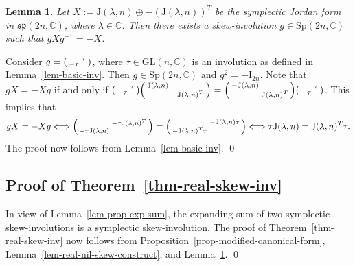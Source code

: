 \documentclass[11pt,reqno]{amsart}
\renewenvironment{proof}{{\bfseries Proof.}}{\qed}
\numberwithin{equation}{section}
\newtheorem{lemma}[theorem]{Lemma}
\theoremstyle{definition}
\def\C{\mathbb C}
\def\C{\mathbb {C}}
\newcommand{\thmref}[1]{Theorem~\ref{#1}}
\newcommand{\lemref}[1]{Lemma~\ref{#1}}
\newcommand{\propref}[1]{Proposition~\ref{#1}}
\begin{document}
\begin{lemma}\label{lem-real-non-nil-skew-construct}
	Let $X:= \mathrm{J}(\lambda, n) \oplus - (\mathrm{J}(\lambda, n))^{T}$ be the symplectic Jordan form in $\mathfrak{sp}(2n,\mathbb{C})$, where $\lambda \in \C$. Then there exists a skew-involution $g\in \mathrm{Sp}(2n,\mathbb{C})$ such that $gXg^{-1}=-X$.
\end{lemma}
\begin{proof}
	Consider $g=  \begin{psmallmatrix}
		& \tau\\
		-	\tau	& 
	\end{psmallmatrix}$, where $\tau \in \mathrm{GL}(n,\C)$ is an involution  as defined in \lemref{lem-basic-inv}. Then  $g \in \mathrm{Sp}(2n,\mathbb{C})$ and $ g^2= -\mathrm{I}_{2n}$. Note that $gX =-Xg$ if and only if $ \begin{psmallmatrix}
		& \tau\\
		-	\tau	& 
	\end{psmallmatrix} \begin{psmallmatrix}
		\mathrm{J}(\lambda, n) &  \\
		& -  \mathrm{J}(\lambda, n)^{T}
	\end{psmallmatrix} =   \begin{psmallmatrix}
		-	\mathrm{J}(\lambda, n) &  \\
		&  \mathrm{J}(\lambda, n)^{T}
	\end{psmallmatrix} \begin{psmallmatrix}
		& \tau\\
		-	\tau	& 
	\end{psmallmatrix}$. This implies that
	\begin{equation*}
		gX =-Xg	\Longleftrightarrow 	\begin{psmallmatrix}
			& 	-\tau  \mathrm{J}(\lambda, n)^{T}\\
			- \tau	 \mathrm{J}(\lambda, n)	& 	
		\end{psmallmatrix} =  	\begin{psmallmatrix}
			& 	- \mathrm{J}(\lambda, n) \tau \\
			- 	 \mathrm{J}(\lambda, n)^{T} \tau	& 	
		\end{psmallmatrix}  \Longleftrightarrow  \tau \mathrm{J}(\lambda, n) = 	\mathrm{J}(\lambda, n)^{T} \tau.
	\end{equation*}
	The proof now follows from \lemref{lem-basic-inv}.
\end{proof}

\subsection{Proof of \thmref{thm-real-skew-inv}} In view of \lemref{lem-prop-exp-sum}, the expanding sum of two symplectic skew-involutions is a symplectic skew-involution. The proof of  \thmref{thm-real-skew-inv} now follows from \propref{prop-modified-canonical-form}, \lemref{lem-real-nil-skew-construct}, and \lemref{lem-real-non-nil-skew-construct}.
\qed
\end{document}

